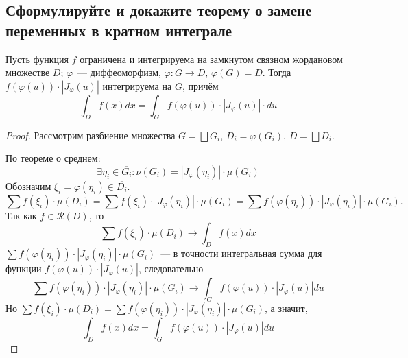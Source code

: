 
\subsection{Сформулируйте и докажите теорему о замене переменных в кратном интеграле}

\begin{theorem*}
    Пусть функция $f$ ограничена и интегрируема на замкнутом связном жордановом множестве $D$; $\varphi$~--- диффеоморфизм, $\varphi: G \to D$, $\varphi(G) = D$. Тогда $f(\varphi(u)) \cdot |J_\varphi(u)|$ интегрируема на $G$, причём 
    \begin{equation*}
        \int_D f(x)dx = \int_G f(\varphi(u)) \cdot |J_\varphi(u)| \cdot du
    \end{equation*}
\end{theorem*}
\begin{proof}
    Рассмотрим разбиение множества $G = \bigsqcup G_i$, $D_i = \varphi(G_i)$, $D = \bigsqcup D_i$. 

    По теореме о среднем:
    \begin{equation*}
        \exists \eta_i \in \overline{G_i}: \nu(G_i) = |J_\varphi(\eta_i)| \cdot \mu(G_i)
    \end{equation*}
    Обозначим $\xi_i = \varphi(\eta_i) \in \overline{D_i}$.
    \begin{equation*}
        \sum f(\xi_i) \cdot \mu(D_i) = \sum f(\xi_i) \cdot |J_\varphi(\eta_i)| \cdot \mu(G_i) = \sum f(\varphi(\eta_i)) \cdot |J_\varphi(\eta_i)| \cdot \mu(G_i).
    \end{equation*}
    Так как $f \in \mathcal{R}(D)$, то 
    \begin{equation*}
        \sum f(\xi_i) \cdot \mu(D_i) \to \int_D f(x) dx
    \end{equation*}
    $\sum f(\varphi(\eta_i)) \cdot |J_\varphi(\eta_i)| \cdot \mu(G_i)$~--- в точности интегральная сумма для функции $f(\varphi(u)) \cdot |J_\varphi(u)|$, следовательно
    \begin{equation*}
        \sum f(\varphi(\eta_i)) \cdot |J_\varphi(\eta_i)| \cdot \mu(G_i) \to \int_G f(\varphi(u)) \cdot |J_\varphi(u)| du
    \end{equation*}
    Но $\sum f(\xi_i) \cdot \mu(D_i) = \sum f(\varphi(\eta_i)) \cdot |J_\varphi(\eta_i)| \cdot \mu(G_i)$, а значит,
    \begin{equation*}
        \int_D f(x) dx = \int_G f(\varphi(u)) \cdot |J_\varphi(u)| du
    \end{equation*}
\end{proof}